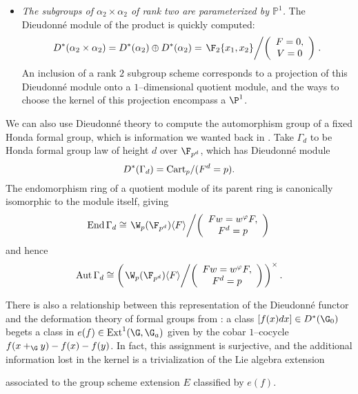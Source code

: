 \begin{example}
\begin{itemize}
\item \textit{The subgroups of $\alpha_2 \times \alpha_2$ of rank two are parameterized by $\mathbb{P}^1$.}  The Dieudonn\'e module of the product is quickly computed: \[D^*(\alpha_2 \times \alpha_2) = D^*(\alpha_2) \oplus D^*(\alpha_2) = \left.\F_2\{x_1, x_2\} \middle/ \left( \begin{array}{c} F = 0, \\ V = 0 \end{array} \right) \right. .\]  An inclusion of a rank $2$ subgroup scheme corresponds to a projection of this Dieudonn\'e module onto a $1$--dimensional quotient module, and the ways to choose the kernel of this projection encompass a $\P^1$.
\end{itemize}
\end{example}

\begin{example}\label{FormOfStabilizerGroup}
We can also use Dieudonn\'e theory to compute the automorphism group of a fixed Honda formal group, which is information we wanted back in .  Take $\Gamma_d$ to be Honda formal group law of height $d$ over $\F_{p^d}$, which has Dieudonn\'e module \[D^*(\Gamma_d) = \mathrm{Cart}_p / (F^d = p).\]  The endomorphism ring of a quotient module of its parent ring is canonically isomorphic to the module itself, giving \[\End \Gamma_d \cong \left. \W_p(\F_{p^d}) \<F\> \middle/ \left( \begin{array}{c} Fw = w^\phi F, \\ F^d = p \end{array} \right) \right.\] and hence \[\Aut \Gamma_d \cong \left(\left. \W_p(\F_{p^d}) \<F\> \middle/ \left( \begin{array}{c} Fw = w^\phi F, \\ F^d = p \end{array} \right) \right.\right)^\times.\]
\end{example}

\begin{remark}\label{ExtensionsPresentationOfDieudonne}
There is also a relationship between this representation of the Dieudonn\'e functor and the deformation theory of formal groups from : a class $[f(x)dx] \in D^*(\G_0)$ begets a class in $e(f) \in \Ext^1(\G, \G_a)$ given by the cobar $1$--cocycle $f(x +_{\G} y) - f(x) - f(y)$.  In fact, this assignment is surjective, and the additional information lost in the kernel is a trivialization of the Lie algebra extension
\begin{center}
\end{center}
associated to the group scheme extension $E$ classified by $e(f)$.
\end{remark}

